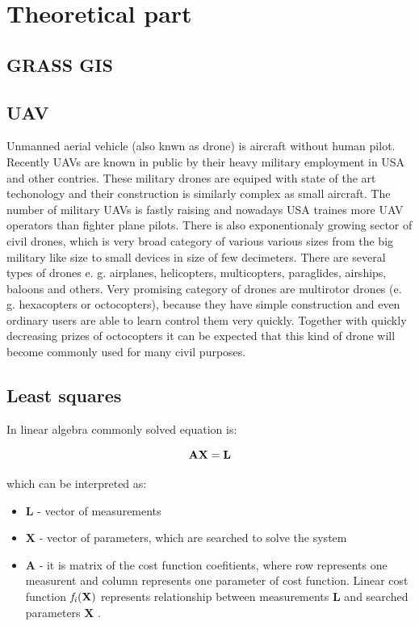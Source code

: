 \documentclass[a4paper,12pt]{report}
\newcommand{\ematr}[1]{
{\bf #1}
}
\newcommand{\evect}[1]{
{\bf #1}
}
\newcommand{\efunc}[1]{
{\it #1}
}
\begin{document}
\newpage

\chapter{Theoretical part}


\section{GRASS GIS}

\section{UAV}

Unmanned aerial vehicle (also knwn as drone) is aircraft without human pilot. Recently UAVs are known in public by
their heavy military employment in USA and other contries. These military drones are equiped with state of the art 
techonology and their construction is similarly complex as small aircraft.
The number of military UAVs is fastly raising and nowadays USA traines more UAV operators than fighter plane pilots. 
There is also exponentionaly growing sector of civil drones, which is very broad category of various various sizes 
from the big military like size to small devices in size of few decimeters. There are several types of drones e. g. airplanes,
helicopters, multicopters, paraglides, airships, baloons and others. 
Very promising category of drones are multirotor drones (e. g. hexacopters or octocopters), because they have simple construction and 
even ordinary users are able to learn control them very quickly. Together with quickly decreasing prizes of octocopters it can be expected 
that this kind of drone will become commonly used for many civil purposes. 

\section{Least squares}
\label{sec:least}


In linear algebra commonly solved equation is:

\begin{equation}
\label{eq:linear_eq}
\ematr{A}\evect{X} = \evect{L} 
\end{equation} 

which can be interpreted as:
\begin{itemize}
\item \evect{L} - vector of measurements
\item \evect{X} - vector of parameters, which are searched to solve the system
\item \ematr{A} - it is matrix of the cost function  coefitients,  where row represents one measurent 
		  and column represents one parameter of cost function. Linear cost function $\efunc{f_{i}(\evect{X})}$
		  represents relationship between measurements \evect{L} and searched parameters \evect{X}. 
\end{itemize}
\end{document}

